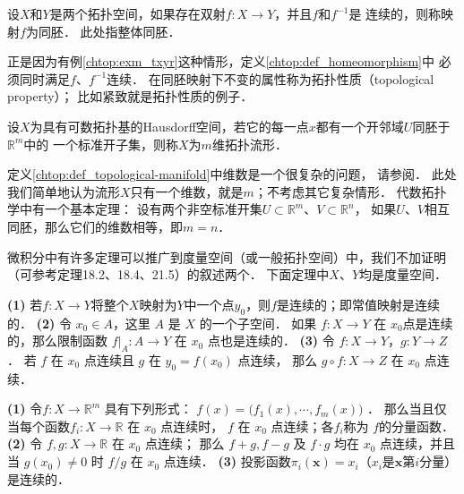 \begin{definition}\label{chtop:def_homeomorphism}
    设$X$和$Y$是两个拓扑空间，如果存在双射$f:X\to Y$，并且$f$和$f^{-1}$是
    连续的，则称映射$f$为{\heiti 同胚}． 此处指整体同胚．  
\end{definition}

正是因为有例\ref{chtop:exm_txyr}这种情形，定义\ref{chtop:def_homeomorphism}中
必须同时满足$f$、$f^{-1}$连续．
在同胚映射下不变的属性称为{\heiti 拓扑性质}（topological property）；
比如紧致就是拓扑性质的例子．


\begin{definition}\label{chtop:def_topological-manifold}
    设$X$为具有可数拓扑基的Hausdorff空间，若它的每一点$x$都有一个开邻域$U$同胚于$\mathbb{R}^m$中的
    一个标准开子集，则称$X$为$m$维{\heiti 拓扑流形}．
\end{definition}

定义\ref{chtop:def_topological-manifold}中{\kaishu 维数}是一个很复杂的问题，
请参阅\parencite[\S 50]{munkres-2000-topology}．
此处我们简单地认为流形$X$只有一个维数，就是$m$；不考虑其它复杂情形．
代数拓扑学中有一个基本定理：  %
设有两个非空标准开集$U\subset \mathbb{R}^m$、$V\subset \mathbb{R}^n$，
如果$U$、$V$相互同胚，那么它们的维数相等，即$m=n$．


微积分中有许多定理可以推广到度量空间（或一般拓扑空间）中，我们不加证明
（可参考\parencite{munkres-2000-topology}定理18.2、18.4、21.5）的叙述两个．
下面定理中$X$、$Y$均是度量空间．

\begin{theorem}
    {\bfseries (1)} 若$f:X\to Y$将整个$X$映射为$Y$中一个点$y_0$，则$f$是连续的；即常值映射是连续的．
    {\bfseries (2)} 令 $x_0 \in A$，这里 $A$ 是 $X$ 的一个子空间．
    如果 $f: X \rightarrow Y$ 在 $x_0$点是连续的，那么限制函数 $\left.f\right|_A: A \rightarrow Y$
    在 $x_0$ 点也是连续的．
    {\bfseries (3)} 令 $f: X \rightarrow Y$，$g: Y \rightarrow Z$．
    若 $f$ 在 $x_0$ 点连续且 $g$ 在 $y_0=f\left(x_0\right)$ 点连续，
    那么 $g \circ f: X \rightarrow Z$ 在 $x_0$ 点连续．
\end{theorem}


\begin{theorem}
    {\bfseries (1)} 令$f: X \rightarrow \mathbb{R}^m$ 具有下列形式：
    $    f(x)=\bigl(f_1(x), \cdots, f_m(x)\bigr)     $    ．
    那么当且仅当每个函数$f_{i}: X \rightarrow \mathbb{R}$ 在 $x_0$ 点连续时，
    $f$ 在 $x_0$ 点连续；各$f_i$称为 $f$的分量函数．    
    {\bfseries (2)} 令 $f, g: X \rightarrow \mathbb{R}$ 在 $x_0$ 点连续；
    那么 $f+g, f-g$ 及 $f \cdot g$ 均在 $x_0$ 点连续，并且当 $g(x_0) \neq 0$ 时 $f / g$ 在 $x_0$ 点连续．
    {\bfseries (3)} 投影函数$\pi_i(\boldsymbol{x})=x_i$（$x_i$是$\boldsymbol{x}$第$i$分量）是连续的．
\end{theorem}










